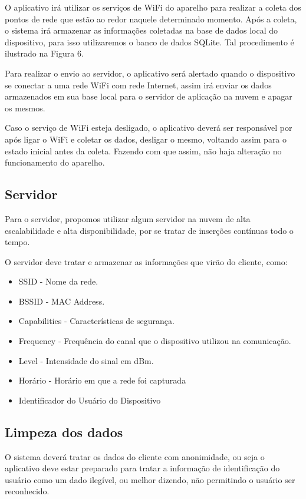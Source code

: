 \documentclass[12pt, %
openright, 
oneside,
a4paper,
brazil]{facom-ufu-abntex2}
\begin{document}
O aplicativo irá utilizar os serviços de \ac{WiFi} do aparelho para realizar a coleta dos pontos de rede que estão ao redor naquele determinado momento. Após a coleta, o sistema irá armazenar as informações coletadas na base de dados local do 	dispositivo, para isso utilizaremos o banco de dados SQLite. Tal procedimento é ilustrado na Figura 6.

Para realizar o envio ao servidor, o aplicativo será alertado quando o dispositivo se conectar a uma rede \ac{WiFi} com rede Internet, assim irá enviar os dados armazenados em sua base local para o servidor de aplicação na nuvem e apagar os mesmos. 

Caso o serviço de \ac{WiFi} esteja desligado, o aplicativo deverá ser responsável por após ligar o \ac{WiFi} e coletar os dados, desligar o mesmo, voltando assim para o estado inicial antes da coleta. Fazendo com que assim, não haja alteração no funcionamento do aparelho.




\subsection{Servidor}
Para o servidor, propomos utilizar algum servidor na nuvem de alta escalabilidade e alta disponibilidade, por se tratar de inserções contínuas todo o tempo.

O servidor deve tratar e  armazenar as informações que virão do cliente, como:
\begin{itemize}
  \item \ac{SSID} - Nome da rede.
  \item  \ac{BSSID} - MAC Address. 
  \item Capabilities - Características de segurança. 
  \item Frequency - Frequência do canal que o dispositivo utilizou na comunicação.
  \item Level - Intensidade do sinal em \ac{dBm}.
  \item Horário - Horário em que a rede foi capturada
  \item Identificador do Usuário do Dispositivo
  \end{itemize}
  
\subsection{Limpeza dos dados}
O sistema deverá tratar os dados do cliente com anonimidade, ou seja o aplicativo deve estar preparado para tratar a informação de identificação do usuário como um dado ilegível, ou melhor dizendo, não permitindo o usuário ser reconhecido. 
\end{document}
